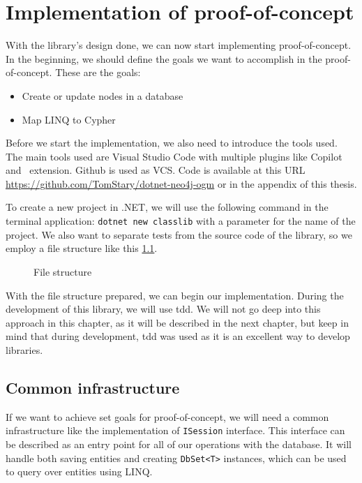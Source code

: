 \chapter {Implementation of proof-of-concept}

With the library's design done, we can now start implementing proof-of-concept.
In the beginning, we should define the goals we want to accomplish in the proof-of-concept.
These are the goals:
\begin{itemize}
    \item {Create or update nodes in a database}
    \item {Map LINQ to Cypher}
\end{itemize}

Before we start the implementation, we also need to introduce the tools used.
The main tools used are Visual Studio Code with multiple plugins like Copilot and \CS\ extension.
Github is used as VCS. Code is available at this URL \url{https://github.com/TomStary/dotnet-neo4j-ogm} or in the appendix of this thesis.

To create a new project in .NET, we will use the following command in the terminal application: \texttt{dotnet new classlib} with a parameter for the name of the project.
We also want to separate tests from the source code of the library, so we employ a file structure like this \ref{ref:fileStructure}.

\begin{figure}[H]
    \caption{File structure}
    \label{ref:fileStructure}
\end{figure}

With the file structure prepared, we can begin our implementation.
During the development of this library, we will use \acrfull{tdd}.
We will not go deep into this approach in this chapter, as it will be described in the next chapter, but keep in mind that during development, \acrshort{tdd} was used as it is an excellent way to develop libraries.

\section {Common infrastructure}

If we want to achieve set goals for proof-of-concept, we will need a common infrastructure like the implementation of \texttt{ISession} interface.
This interface can be described as an entry point for all of our operations with the database.
It will handle both saving entities and creating \texttt{DbSet<T>} instances, which can be used to query over entities using LINQ.

